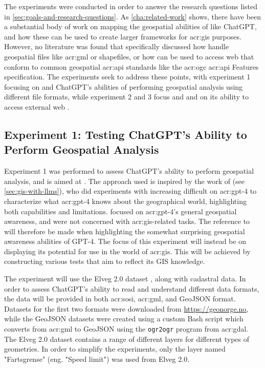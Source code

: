 The experiments were conducted in order to answer the research questions listed in \autoref{sec:goals-and-research-questions}. As \autoref{cha:related-work} shows, there have been a substantial body of work on mapping the geospatial abilities of  like ChatGPT, and how these can be used to create larger frameworks for \acrshort{acr:gis} purposes. However, no literature was found that specifically discussed how  handle geospatial files like \acrshort{acr:gml} or shapefiles, or how  can be used to access web  that conform to common geospatial \acrshort{acr:api} standards like the \acrshort{acr:ogc} \acrshort{acr:api} Features specification. The experiments seek to address these points, with experiment 1 focusing on  and ChatGPT's abilities of performing geospatial analysis using different file formats, while experiment 2 and 3 focus  and  and on its ability to access external web .

\subsection{Experiment 1: Testing ChatGPT's Ability to Perform Geospatial Analysis}

Experiment 1 was performed to assess ChatGPT's ability to perform geospatial analysis, and is aimed at . The approach used is inspired by the work of \cite{robertsGPT4GEOHowLanguage2023} (see \autoref{sec:gis-with-llms}), who did experiments with increasing difficult on \acrshort{acr:gpt}-4 to characterize what \acrshort{acr:gpt}-4 knows about the geographical world, highlighting both capabilities and limitations. \citeauthor{robertsGPT4GEOHowLanguage2023} focused on \acrshort{acr:gpt}-4's general geospatial awareness, and were not concerned with \acrshort{acr:gis}-related tasks. The reference to \cite{robertsGPT4GEOHowLanguage2023} will therefore be made when highlighting the somewhat surprising geospatial awareness abilities of GPT-4. The focus of this experiment will instead be on displaying its potential for use in the world of \acrshort{acr:gis}. This will be achieved by constructing various tests that aim to reflect its GIS knowledge.

The experiment will use the Elveg 2.0 dataset \citep{thenorwegianmappingauthorityElveg2019}, along with cadastral data. In order to assess ChatGPT's ability to read and understand different data formats, the data will be provided in both \acrshort{acr:sosi}, \acrshort{acr:gml}, and GeoJSON format. Datasets for the first two formats were downloaded from \url{https://geonorge.no}, while the GeoJSON datasets were created using a custom Bash script which converts from \acrshort{acr:gml} to GeoJSON using the \texttt{ogr2ogr} program from \acrshort{acr:gdal}. The Elveg 2.0 dataset contains a range of different layers for different types of geometries. In order to simplify the experiments, only the layer named "Fartsgrense" (eng. "Speed limit") was used from Elveg 2.0.

